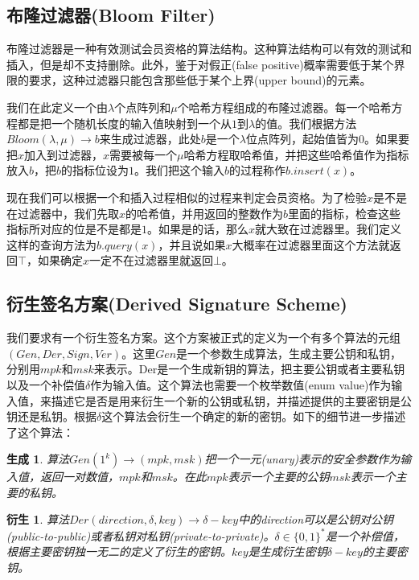 \documentclass[UTF8]{ctexart}
\newtheorem*{generation}{生成}
\newtheorem*{derive}{衍生}
\begin{document}
\subsection{布隆过滤器(Bloom Filter)}
布隆过滤器是一种有效测试会员资格的算法结构。这种算法结构可以有效的测试和插入，但是却不支持删除。此外，鉴于对假正(false positive)概率需要低于某个界限的要求，这种过滤器只能包含那些低于某个上界(upper bound)的元素。

我们在此定义一个由$\lambda$个点阵列和$\mu$个哈希方程组成的布隆过滤器。每一个哈希方程都是把一个随机长度的输入值映射到一个从$1$到$\lambda$的值。我们根据方法$Bloom(\lambda, \mu) \to b$来生成过滤器，此处$b$是一个$\lambda$位点阵列，起始值皆为$0$。如果要把$x$加入到过滤器，$x$需要被每一个$\mu$哈希方程取哈希值，并把这些哈希值作为指标放入$b$，把$b$的指标位设为$1$。我们把这个输入$b$的过程称作$b.insert(x)$。

现在我们可以根据一个和插入过程相似的过程来判定会员资格。为了检验$x$是不是在过滤器中，我们先取$x$的哈希值，并用返回的整数作为$b$里面的指标，检查这些指标所对应的位是不是都是$1$。如果是的话，那么$x$就大致在过滤器里。我们定义这样的查询方法为$b.query(x)$，并且说如果$x$大概率在过滤器里面这个方法就返回$\top$，如果确定$x$一定不在过滤器里就返回$\bot$。

\subsection{衍生签名方案(Derived Signature Scheme)}
我们要求有一个衍生签名方案。这个方案被正式的定义为一个有多个算法的元组$(Gen, Der, Sign, Ver)$。这里$Gen$是一个参数生成算法，生成主要公钥和私钥，分别用$mpk$和$msk$来表示。Der是一个生成新钥的算法，把主要公钥或者主要私钥以及一个补偿值$\delta$作为输入值。这个算法也需要一个枚举数值(enum value)作为输入值，来描述它是否是用来衍生一个新的公钥或私钥，并描述提供的主要密钥是公钥还是私钥。根据$\delta$这个算法会衍生一个确定的新的密钥。如下的细节进一步描述了这个算法：

\begin{generation}
算法$Gen(1^k) \to (mpk, msk)$把一个一元(unary)表示的安全参数作为输入值，返回一对数值，$mpk$和$msk$。在此$mpk$表示一个主要的公钥$msk$表示一个主要的私钥。
\end{generation}

\begin{derive}
算法$Der(direction, \delta, key) \to \delta-key$中的direction可以是公钥对公钥(public-to-public)或者私钥对私钥(private-to-private)。$\delta \in \{0, 1\}^*$是一个补偿值，根据主要密钥独一无二的定义了衍生的密钥。$key$是生成衍生密钥$\delta-key$的主要密钥。
\end{derive}
\end{document}
